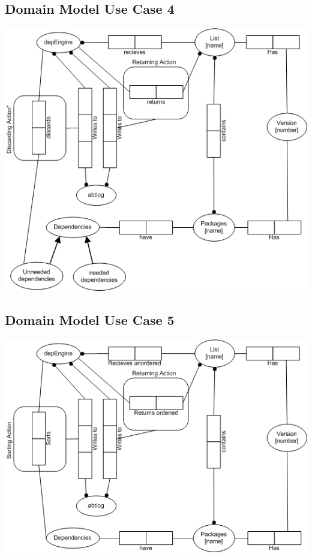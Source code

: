 \subsection{Domain Model Use Case 4}
\includegraphics{dms/ORM004.jpg}
\subsection{Domain Model Use Case 5}
\includegraphics{dms/ORM005.jpg}
